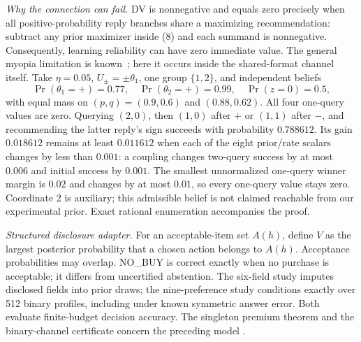 \documentclass[sigconf,anonymous,review]{acmart}
\begin{document}
\emph{Why the connection can fail.} DV is nonnegative and equals zero precisely when all positive-probability reply branches share a maximizing recommendation: subtract any prior maximizer inside (8) and each summand is nonnegative. Consequently, learning reliability can have zero immediate value. The general myopia limitation is known~\cite{r1,r10,r11}; here it occurs inside the shared-format channel itself. Take $\eta=0.05$, $U_\pm=\pm\theta_1$, one group $\{1,2\}$, and independent beliefs
\[\Pr(\theta_1=+)=0.77,\quad \Pr(\theta_2=+)=0.99,\quad\Pr(z=0)=0.5,\]
with equal mass on $(p,q)=(0.9,0.6)$ and $(0.88,0.62)$. All four one-query values are zero. Querying $(2,0)$, then $(1,0)$ after $+$ or $(1,1)$ after $-$, and recommending the latter reply's sign succeeds with probability $0.788612$. Its gain $0.018612$ remains at least $0.011612$ when each of the eight prior/rate scalars changes by less than $0.001$: a coupling changes two-query success by at most $0.006$ and initial success by $0.001$. The smallest unnormalized one-query winner margin is $0.02$ and changes by at most $0.01$, so every one-query value stays zero. Coordinate 2 is auxiliary; this admissible belief is not claimed reachable from our experimental prior. Exact rational enumeration accompanies the proof.
\par
\emph{Structured disclosure adapter.} For an acceptable-item set $A(h)$, define $V$ as the largest posterior probability that a chosen action belongs to $A(h)$. Acceptance probabilities may overlap. NO\_BUY is correct exactly when no purchase is acceptable; it differs from uncertified abstention. The six-field study imputes disclosed fields into prior draws; the nine-preference study conditions exactly over 512 binary profiles, including under known symmetric answer error. Both evaluate finite-budget decision accuracy. The singleton premium theorem and the binary-channel certificate concern the preceding model \cite{r2}.
\end{document}

